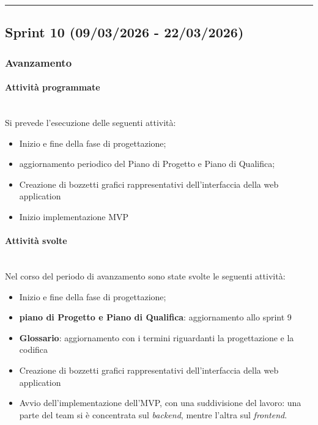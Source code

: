\documentclass[10pt, letterpaper]{article}
\newcommand{\trisubsection}[1]{\paragraph{#1}\mbox{}\\}
\begin{document}
\vspace{1em}
    \hrule
    \vspace{1em}

    \subsection{Sprint 10 (09/03/2026 - 22/03/2026)}
    \subsubsection{Avanzamento}
    \trisubsection{Attività programmate}
    Si prevede l'esecuzione delle seguenti attività:
    \begin{itemize}
        \item Inizio e fine della fase di progettazione;
        \item aggiornamento periodico del Piano di Progetto e Piano di Qualifica;
        \item Creazione di bozzetti grafici rappresentativi dell’interfaccia della web application
        \item Inizio implementazione MVP
    \end{itemize}

    \trisubsection{Attività svolte}
    Nel corso del periodo di avanzamento sono state svolte le seguenti attività:
    \begin{itemize}
        \item Inizio e fine della fase di progettazione;
        \item \textbf{piano di Progetto e Piano di Qualifica}: aggiornamento allo sprint 9
        \item \textbf{Glossario}: aggiornamento con i termini riguardanti la progettazione e la codifica
        \item Creazione di bozzetti grafici rappresentativi dell’interfaccia della web application
        \item Avvio dell’implementazione dell’MVP, con una suddivisione del lavoro: una parte del team si è concentrata sul \textit{backend}, mentre l’altra sul \textit{frontend}.
    \end{itemize}
\end{document}
